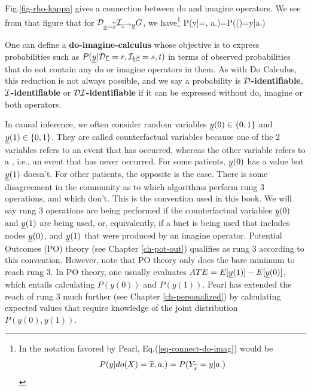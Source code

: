Fig.\ref{fig-rho-kappa}
gives  a connection
between do and imagine
operators.
We see
from that figure that
for $\cald_{\rvx=\TIL{x}}
\cali_{\rvx\rarrow\rvy}G$, we have\footnote{In the
notation favored by Pearl, Eq.(\ref{eq-connect-do-imag})
 would be
$$P(y|do(X)={\widetilde{x}}, a.)=P(Y_{{\widetilde{x}}}=y|a.)$$}
\beq
P(y|\cald\rvx=, a.)=P(\rvy()=y|a.)
\label{eq-connect-do-imag}
\eeq


One can define
a {\bf do-imagine-calculus}
whose
objective
is to
express
probabilities such as
$P(\rvy|\cald\rvr=r,
\cali_\rvb \rvs=s, t)$
in terms of observed
probabilities
that do not
contain
any do or imagine
operators in them.
As with
Do Calculus,
this reduction
is not
always possible,
and we say a probability is
{\bf ${\cal D}$-identifiable},
{\bf ${\cal I}$-identifiable}
or
{\bf ${\cal D}{\cal I}$-identifiable}
if it  can be
expressed without do, imagine
or both operators.

In causal inference,
we often
consider  
random variables $\rvy(0)\in \bool$
and $\rvy(1)\in\bool$. They are called
counterfactual variables because
one of the 2 variables 
refers to an event that has occurred,
whereas the other variable
refers to a ,
i.e., an event that has never 
occurred. For some patients,
$\rvy(0)$ has a value
but $\rvy(1)$
doesn't.
For other 
patients,
the opposite 
is the case.
There is some
disagreement in the
community
as to which algorithms
perform rung 3 operations,
and which don't.
This is the convention
used in this book.
We will
say rung 3 operations
are being performed 
if
the counterfactual variables $\rvy(0)$
and $\rvy(1)$
are being used,
or, equivalently,
if a bnet
is being used that
includes nodes $\rvy(0)$, and $\rvy(1)$
that were produced by an imagine operator.
Potential Outcomes (PO)
theory (see Chapter \ref{ch-pot-out})
qualifies as rung 3 according
to this convention.
However, note that PO theory 
only does the bare minimum 
to reach rung 3.
In PO theory, one usually
evaluates $ATE=E[\rvy(1)]-E[\rvy(0)]$,
which entails
calculating $P(y(0))$
and $P(y(1))$.
Pearl has extended the reach of rung 3
much further (see Chapter \ref{ch-personalized})
by calculating expected
values that require knowledge of
the joint distribution $P(y(0), y(1))$.

